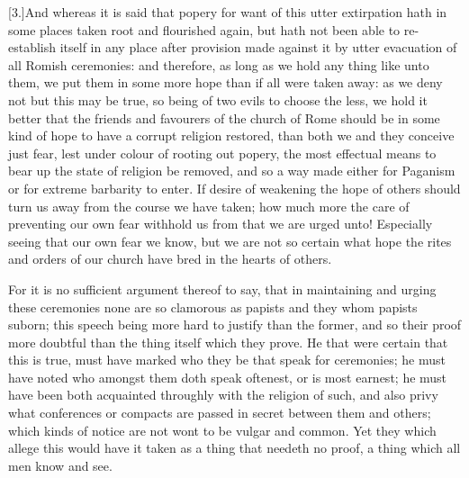 [3.]And whereas it is said that popery for want of this utter extirpation hath in some places taken root and flourished again, but hath not been able to re-establish itself in any place after provision made against it by utter evacuation of all Romish ceremonies: and therefore, as long as we hold any thing like unto them, we put them in some more hope than if all were taken away: as we deny not but this may be true, so being of two evils to choose the less, we hold it better that the friends and favourers of the church of Rome should be in some kind of hope to have a corrupt religion restored, than both we and they conceive just fear, lest under colour of rooting out popery, the most effectual means to bear up the state of religion be removed, and so a way made either for Paganism or for extreme barbarity to enter. If desire of weakening the hope of others should turn us away from the course we have taken; how much more the care of preventing our own fear withhold us from that we are urged unto! Especially seeing that our own fear we know, but we are not so certain what hope the rites and orders of our church have bred in the hearts of others.

For it is no sufficient argument thereof to say, that in  maintaining and urging these ceremonies none are so clamorous as papists and they whom papists suborn; this speech being more hard to justify than the former, and so their proof more doubtful than the thing itself which they prove. He that were certain that this is true, must have marked who they be that speak for ceremonies; he must have noted who amongst them doth speak oftenest, or is most earnest; he must have been both acquainted throughly with the religion of such, and also privy what conferences or compacts are passed in secret between them and others; which kinds of notice are not wont to be vulgar and common. Yet they which allege this would have it taken as a thing that needeth no proof, a thing which all men know and see.

